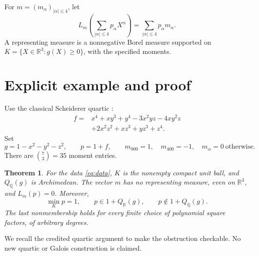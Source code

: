 \documentclass[11pt]{article}
\newcommand{\Q}{\mathbb Q}
\newcommand{\R}{\mathbb R}
\newtheorem{theorem}{Theorem}
\begin{document}
For \(m=(m_\alpha)_{|\alpha|\leq4}\), let
\[
 L_m\left(\sum_{|\alpha|\leq4}p_\alpha X^\alpha\right)
       =\sum_{|\alpha|\leq4}p_\alpha m_\alpha .
\]
A representing measure is a nonnegative Borel measure supported on
\(K=\{X\in\R^3:g(X)\geq0\}\), with the specified moments.

\section{Explicit example and proof}
Use the classical Scheiderer quartic
\cite[Theorem~2.1 and Example~2.8]{Sch16}:
\begin{equation}\label{eq:f}
\begin{split}
 f={}&x^4+xy^3+y^4-3x^2yz-4xy^2z\\
     &+2x^2z^2+xz^3+yz^3+z^4 .
\end{split}
\end{equation}
Set
\begin{equation}\label{eq:data}
 g=1-x^2-y^2-z^2,\qquad p=1+f,\qquad
 m_{000}=1,\quad m_{400}=-1,\quad
 m_\alpha=0\ \text{otherwise}.
\end{equation}
There are \(\binom{7}{3}=35\) moment entries.

\begin{theorem}\label{thm:main}
For the data \eqref{eq:data}, \(K\) is the nonempty compact unit ball,
and \(Q_{\Q}(g)\) is Archimedean. The vector \(m\) has no representing
measure, even on \(\R^3\), and \(L_m(p)=0\). Moreover,
\[
 \min_Kp=1,\qquad
 p\in1+Q_{\R}(g),\qquad p\notin1+Q_{\Q}(g).
\]
The last nonmembership holds for every finite choice of polynomial
square factors, of arbitrary degrees.
\end{theorem}

We recall the credited quartic argument to make the obstruction checkable.
No new quartic or Galois construction is claimed.
\end{document}
